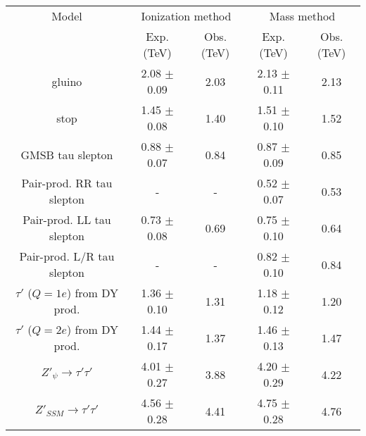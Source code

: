 \begin{table}
   \label{tab:MassLimits} 
  \begin{center}
  \begin{tabular}{ccccc} \hline
     Model       & \multicolumn{2}{c}{Ionization method} & \multicolumn{2}{c}{Mass method} \\
				       & Exp. (TeV) & Obs. (TeV) & Exp. (TeV)  & Obs. (TeV) \\ \hline
	  {gluino}       & 2.08 $\pm$ 0.09 & 2.03  & 2.13 $\pm$ 0.11   & 2.13    \\
	  {stop}         & 1.45 $\pm$ 0.08 & 1.40  & 1.51 $\pm$  0.10  & 1.52    \\
	  {GMSB tau slepton}    & 0.88 $\pm$ 0.07 & 0.84  & 0.87 $\pm$ 0.09 & 0.85 \\
	  {Pair-prod. RR tau slepton} & - & - & 0.52 $\pm$ 0.07  & 0.53    \\
	  {Pair-prod. LL tau slepton} & 0.73 $\pm$ 0.08 & 0.69 &  0.75 $\pm$ 0.10  & 0.64   \\
	  {Pair-prod. L/R tau slepton} & - & - & 0.82 $\pm$ 0.10  & 0.84   \\
	  {$\tau'$ ($Q=1e$) from DY prod.}        & 1.36 $\pm$ 0.10 & 1.31  &  1.18  $\pm$  0.12  &  1.20 \\
	  {$\tau'$ ($Q=2e$) from DY prod.}        & 1.44 $\pm$ 0.17 & 1.37  &  1.46  $\pm$  0.13  &  1.47 \\
	  {$Z'_{\psi} \rightarrow \tau' \tau'$ }  & 4.01 $\pm$ 0.27 & 3.88  &  4.20 $\pm$ 0.29 & 4.22  \\ 
	  {$Z'_{SSM} \rightarrow \tau' \tau'$ }   & 4.56 $\pm$ 0.28 & 4.41  & 4.75 $\pm$ 0.28 & 4.76  \\ \hline
  \end{tabular}
 \end{center}
\end{table}

